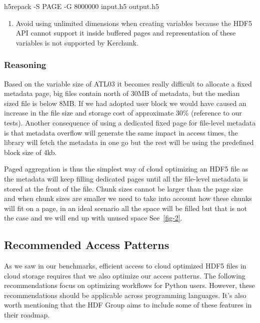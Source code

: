 \documentclass[
]{agujournal2019}
\newenvironment{Shaded}{\begin{snugshade}}{\end{snugshade}}
\newcommand{\AttributeTok}[1]{\textcolor[rgb]{0.40,0.45,0.13}{#1}}
\newcommand{\ExtensionTok}[1]{\textcolor[rgb]{0.00,0.23,0.31}{#1}}
\newcommand{\NormalTok}[1]{\textcolor[rgb]{0.00,0.23,0.31}{#1}}
\providecommand{\tightlist}{%
  \setlength{\itemsep}{0pt}\setlength{\parskip}{0pt}}\usepackage{longtable,booktabs,array}
\begin{document}
\begin{Shaded}
\begin{Highlighting}[]
 \ExtensionTok{h5repack} \AttributeTok{{-}S}\NormalTok{ PAGE }\AttributeTok{{-}G}\NormalTok{ 8000000 input.h5 output.h5}
\end{Highlighting}
\end{Shaded}

\begin{enumerate}
\def\labelenumi{\arabic{enumi}.}
\setcounter{enumi}{2}
\tightlist
\item
  Avoid using unlimited dimensions when creating variables because the
  HDF5 API cannot support it inside buffered pages and representation of
  these variables is not supported by Kerchunk.
\end{enumerate}

\subsubsection{Reasoning}\label{reasoning}

Based on the variable size of ATL03 it becomes really difficult to
allocate a fixed metadata page, big files contain north of 30MB of
metadata, but the median sized file is below 8MB. If we had adopted user
block we would have caused an increase in the file size and storage cost
of approximate 30\% (reference to our tests). Another consequence of
using a dedicated fixed page for file-level metadata is that metadata
overflow will generate the same impact in access times, the library will
fetch the metadata in one go but the rest will be using the predefined
block size of 4kb.

Paged aggregation is thus the simplest way of cloud optimizing an HDF5
file as the metadata will keep filling dedicated pages until all the
file-level metadata is stored at the front of the file. Chunk sizes
cannot be larger than the page size and when chunk sizes are smaller we
need to take into account how these chunks will fit on a page, in an
ideal scenario all the space will be filled but that is not the case and
we will end up with unused space See~\ref{fig-2}.

\subsection{Recommended Access
Patterns}\label{recommended-access-patterns}

As we saw in our benchmarks, efficient access to cloud optimized HDF5
files in cloud storage requires that we also optimize our access
patterns. The following recommendations focus on optimizing workflows
for Python users. However, these recommendations should be applicable
across programming languages. It's also worth mentioning that the HDF
Group aims to include some of these features in their roadmap.
\end{document}
